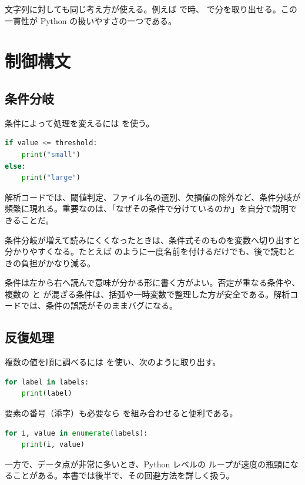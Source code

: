 文字列に対しても同じ考え方が使える。例えば  で時、 で分を取り出せる。この一貫性が Python の扱いやすさの一つである。

\section{制御構文}

\subsection{条件分岐}

条件によって処理を変えるには  を使う。

\begin{lstlisting}[language=Python]
if value <= threshold:
    print("small")
else:
    print("large")
\end{lstlisting}

解析コードでは、閾値判定、ファイル名の選別、欠損値の除外など、条件分岐が頻繁に現れる。重要なのは、「なぜその条件で分けているのか」を自分で説明できることだ。

条件分岐が増えて読みにくくなったときは、条件式そのものを変数へ切り出すと分かりやすくなる。たとえば  のように一度名前を付けるだけでも、後で読むときの負担がかなり減る。

条件は左から右へ読んで意味が分かる形に書く方がよい。否定が重なる条件や、複数の  と  が混ざる条件は、括弧や一時変数で整理した方が安全である。解析コードでは、条件の誤読がそのままバグになる。

\subsection{反復処理}

複数の値を順に調べるには  を使い、次のように取り出す。

\begin{lstlisting}[language=Python]
for label in labels:
    print(label)
\end{lstlisting}

要素の番号（添字）も必要なら  を組み合わせると便利である。

\begin{lstlisting}[language=Python]
for i, value in enumerate(labels):
    print(i, value)
\end{lstlisting}

一方で、データ点が非常に多いとき、Python レベルの  ループが速度の瓶頸になることがある。本書では後半で、その回避方法を詳しく扱う。

